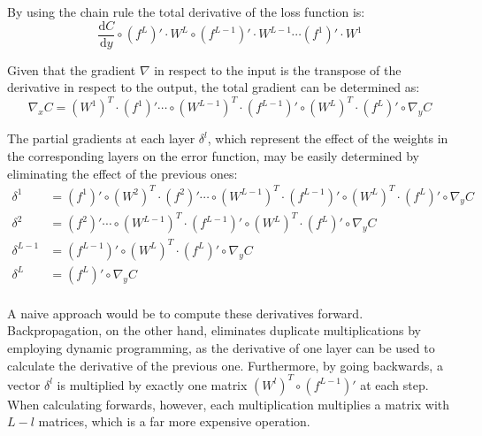 By using the chain rule the total derivative of the loss function is:
\begin{equation}
    \frac{\mathrm{d}C}{\mathrm{d}y} \circ 
    \left( f^L \right)' \cdot W^L 
    \circ \left( f^{L-1} \right)' \cdot W^{L-1} \cdots 
    \left( f^{1} \right)' \cdot W^{1}
	\label{eqn:Backpropagation, total derivative of the loss function}
\end{equation}

Given that the gradient \(\nabla \) in respect to the input is the transpose of the derivative in respect to the output, the total gradient can be determined as:
\begin{equation}
    \nabla_x C =
        \left( W^{1} \right)^T \cdot \left( f^{1} \right)' \cdots \circ
        \left( W^{L-1} \right)^T \cdot \left( f^{L-1} \right)' \circ
        \left( W^{L} \right)^T \cdot \left( f^{L} \right)' \circ
        \nabla_y C
	\label{eqn:Backpropagation, total gradient}
\end{equation}

The partial gradients at each layer \( \delta^l \), which represent the effect of the weights in the corresponding layers on the error function, may be easily determined by eliminating the effect of the previous ones:
\begin{equation}
    \begin{split} 
        \delta^{1} & = 
            \left( f^{1} \right)' \circ 
            \left( W^{2} \right)^T \cdot \left( f^{2} \right)' \cdots \circ
            \left( W^{L-1} \right)^T \cdot \left( f^{L-1} \right)' \circ
            \left( W^{L} \right)^T \cdot \left( f^{L} \right)' \circ
            \nabla_y C\\
        \delta^{2} & =
            \left( f^{2} \right)' \cdots \circ
            \left( W^{L-1} \right)^T \cdot \left( f^{L-1} \right)' \circ
            \left( W^{L} \right)^T \cdot \left( f^{L} \right)' \circ
            \nabla_y C\\
        \delta^{L-1} & =
            \left( f^{L-1} \right)' \circ
            \left( W^{L} \right)^T \cdot \left( f^{L} \right)' \circ
            \nabla_y C\\
        \delta^{L} & =
            \left( f^{L} \right)' \circ
            \nabla_y C\\
    \end{split}
	\label{eqn:Backpropagation, per layer gradient}
\end{equation}

A naive approach would be to compute these derivatives forward. Backpropagation, on the other hand, eliminates duplicate multiplications by employing dynamic programming, as the derivative of one layer can be used to calculate the derivative of the previous one. Furthermore, by going backwards, a vector \(\delta^l\) is multiplied by exactly one matrix \(\left( W^{l} \right)^T \circ \left( f^{L-1} \right)'\) at each step. When calculating forwards, however, each multiplication multiplies a matrix with \( L-l \) matrices, which is a far more expensive operation.

